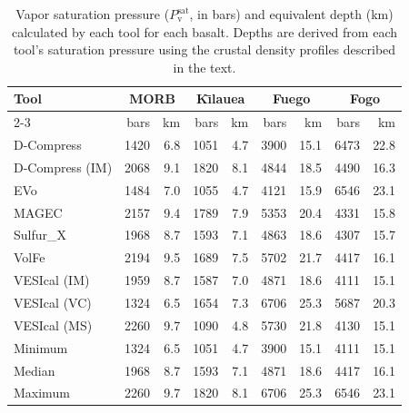 \begin{table}
    \centering
    \begin{tabular}{lrrrrrrrr}
    \hline
        \multirow{2}{*}{Tool} & \multicolumn{2}{c}{MORB} & \multicolumn{2}{c}{K\={\i}lauea} & \multicolumn{2}{c}{Fuego} & \multicolumn{2}{c}{Fogo} \\
        \cline{2-3} \cline{4-5} \cline{6-7} \cline{8-9}
         & bars & km & bars & km & bars & km & bars & km \\ \hline
        D-Compress & 1420 & 6.8 & 1051 & 4.7 & 3900 & 15.1 & 6473 & 22.8 \\
        D-Compress (IM) & 2068 & 9.1 & 1820 & 8.1 & 4844 & 18.5 & 4490 & 16.3 \\
        EVo & 1484 & 7.0 & 1055 & 4.7 & 4121 & 15.9 & 6546 & 23.1 \\
        MAGEC & 2157 & 9.4 & 1789 & 7.9 & 5353 & 20.4 & 4331 & 15.8 \\
        Sulfur\_X & 1968 & 8.7 & 1593 & 7.1 & 4863 & 18.6 & 4307 & 15.7 \\
        VolFe & 2194 & 9.5 & 1689 & 7.5 & 5702 & 21.7 & 4417 & 16.1 \\
        VESIcal (IM) & 1959 & 8.7 & 1587 & 7.0 & 4871 & 18.6 & 4111 & 15.1 \\
        VESIcal (VC) & 1324 & 6.5 & 1654 & 7.3 & 6706 & 25.3 & 5687 & 20.3 \\
        VESIcal (MS) & 2260 & 9.7 & 1090 & 4.8 & 5730 & 21.8 & 4130 & 15.1 \\
        \noalign{\medskip}
        Minimum & 1324 & 6.5 & 1051 & 4.7 & 3900 & 15.1 & 4111 & 15.1 \\
        Median & 1968 & 8.7 & 1593 & 7.1 & 4871 & 18.6 & 4417 & 16.1 \\
        Maximum & 2260 & 9.7 & 1820 & 8.1 & 6706 & 25.3 & 6546 & 23.1 \\
    \hline
    \end{tabular}
    \caption{Vapor saturation pressure ($P_\mathrm{v}^\mathrm{sat}$, in bars) and equivalent depth (km) calculated by each tool for each basalt. Depths are derived from each tool's saturation pressure using the crustal density profiles described in the text.}
    \label{table:SatP_depth}
\end{table}
